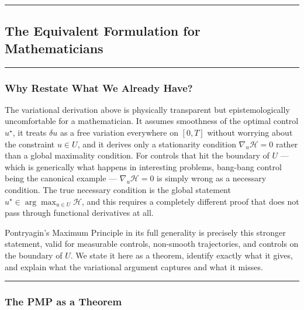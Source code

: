 \documentclass{article}
\begin{document}
\medskip\hrule\medskip

\subsection{The Equivalent Formulation for Mathematicians}
\label{sec:pmp-theorem}

\medskip\hrule\medskip

\subsubsection{Why Restate What We Already Have?}

\begin{mathrequirementsbox}
The variational derivation above is physically transparent but epistemologically uncomfortable for a mathematician. It assumes smoothness of the optimal control $u^\star$, it treats $\delta u$ as a free variation everywhere on $[0,T]$ without worrying about the constraint $u \in U$, and it derives only a stationarity condition $\nabla_u \mathcal{H} = 0$ rather than a global maximality condition. For controls that hit the boundary of $U$ — which is generically what happens in interesting problems, bang-bang control being the canonical example — $\nabla_u \mathcal{H} = 0$ is simply wrong as a necessary condition. The true necessary condition is the global statement $u^\star \in \arg\max_{u \in U} \mathcal{H}$, and this requires a completely different proof that does not pass through functional derivatives at all.

Pontryagin's Maximum Principle in its full generality is precisely this stronger statement, valid for measurable controls, non-smooth trajectories, and controls on the boundary of $U$. We state it here as a theorem, identify exactly what it gives, and explain what the variational argument captures and what it misses.
\end{mathrequirementsbox}

\medskip\hrule\medskip

\subsubsection{The PMP as a Theorem}
\end{document}
